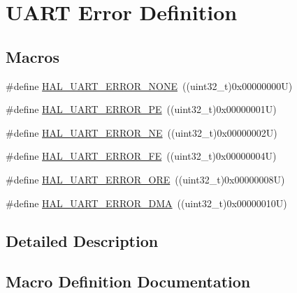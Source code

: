 \hypertarget{group___u_a_r_t___error___definition}{}\section{U\+A\+RT Error Definition}
\label{group___u_a_r_t___error___definition}
\subsection*{Macros}
\begin{DoxyCompactItemize}
\item 
\#define \mbox{\hyperlink{group___u_a_r_t___error___definition_ga275de35cb518c19c284764f3ecb1aac5}{H\+A\+L\+\_\+\+U\+A\+R\+T\+\_\+\+E\+R\+R\+O\+R\+\_\+\+N\+O\+NE}}~((uint32\+\_\+t)0x00000000\+U)
\item 
\#define \mbox{\hyperlink{group___u_a_r_t___error___definition_gad447a37701acd199dcb653ce32917970}{H\+A\+L\+\_\+\+U\+A\+R\+T\+\_\+\+E\+R\+R\+O\+R\+\_\+\+PE}}~((uint32\+\_\+t)0x00000001\+U)
\item 
\#define \mbox{\hyperlink{group___u_a_r_t___error___definition_ga4a4e32a346dd01f4c41c4fc27afbc72c}{H\+A\+L\+\_\+\+U\+A\+R\+T\+\_\+\+E\+R\+R\+O\+R\+\_\+\+NE}}~((uint32\+\_\+t)0x00000002\+U)
\item 
\#define \mbox{\hyperlink{group___u_a_r_t___error___definition_gaf23cb510d4dc2c8e05a45abfbf5f3457}{H\+A\+L\+\_\+\+U\+A\+R\+T\+\_\+\+E\+R\+R\+O\+R\+\_\+\+FE}}~((uint32\+\_\+t)0x00000004\+U)
\item 
\#define \mbox{\hyperlink{group___u_a_r_t___error___definition_gaedc030add6c499cf41be7f12dd95930c}{H\+A\+L\+\_\+\+U\+A\+R\+T\+\_\+\+E\+R\+R\+O\+R\+\_\+\+O\+RE}}~((uint32\+\_\+t)0x00000008\+U)
\item 
\#define \mbox{\hyperlink{group___u_a_r_t___error___definition_gac1d608ae3499a449cd6cd102e7f86605}{H\+A\+L\+\_\+\+U\+A\+R\+T\+\_\+\+E\+R\+R\+O\+R\+\_\+\+D\+MA}}~((uint32\+\_\+t)0x00000010\+U)
\end{DoxyCompactItemize}


\subsection{Detailed Description}


\subsection{Macro Definition Documentation}
\mbox{\label{group___u_a_r_t___error___definition_gac1d608ae3499a449cd6cd102e7f86605}} 
